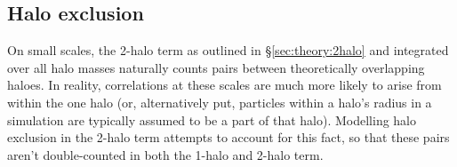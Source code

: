 \documentclass[5p,aas_macros]{elsarticle}
\begin{document}





\subsection{Halo exclusion}
\label{sec:theory:exclusion}
On small scales, the 2-halo term as outlined in \S\ref{sec:theory:2halo} and integrated over all halo masses naturally counts pairs between theoretically overlapping haloes. In reality, correlations at these scales are much more likely to arise from within the one halo (or, alternatively put, particles within a halo's radius in a simulation are typically assumed to be a part of that halo).
Modelling halo exclusion in the 2-halo term attempts to account for this fact, so that these pairs aren't double-counted in both the 1-halo and 2-halo term. %
\end{document}

